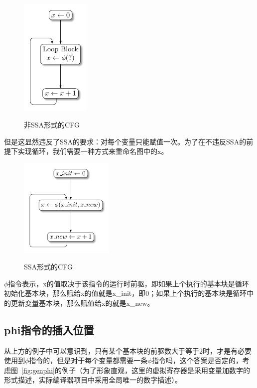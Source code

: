 \begin{figure}[htb]
  \centering
  \includegraphics[width=0.3\textwidth]{figures/noSSA.pdf}
  \label{fig:nossa}
  \caption{非SSA形式的CFG}
\end{figure}


但是这显然违反了SSA的要求：对每个变量只能赋值一次。为了在不违反SSA的前提下实现循环，我们需要一种方式来重命名图中的x。

\begin{figure}[htb]
  \centering
  \includegraphics[width=0.4\textwidth]{figures/SSA.pdf}
  \label{fig:withssa}
  \caption{SSA形式的CFG}

\end{figure}

$\phi$指令表示，x的值取决于该指令的运行时前驱，即如果上个执行的基本块是循环初始化基本块，那么赋给x的值就是x\_init，即0；如果上个执行的基本块是循环中的更新变量基本块，那么赋值给x的就是x\_new。

\subsection{phi指令的插入位置}

从上方的例子中可以意识到，只有某个基本块的前驱数大于等于2时，才是有必要使用到$\phi$指令的，但是对于每个变量都需要一条$\phi$指令吗，这个答案是否定的，考虑图~\ref{fig:genphi}的例子（为了形象直观，这里的虚拟寄存器是采用变量加数字的形式描述，实际编译器项目中采用全局唯一的数字描述）。

